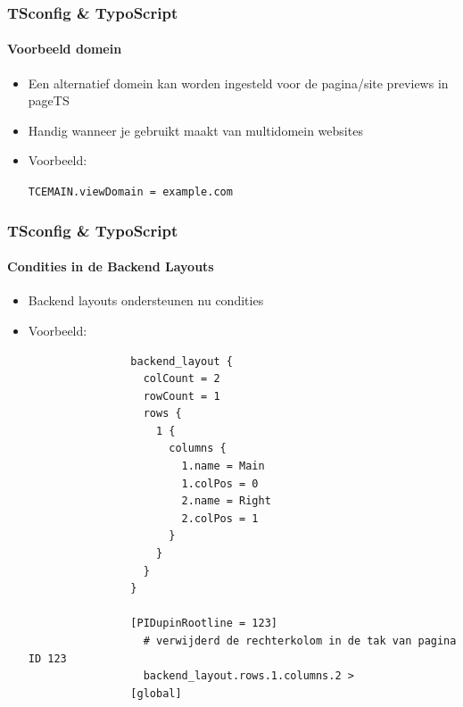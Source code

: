 
\begin{frame}[fragile]
	\frametitle{TSconfig \& TypoScript}
	\framesubtitle{Voorbeeld domein}

	\begin{itemize}

		\item Een alternatief domein kan worden ingesteld voor de pagina/site previews in pageTS
		\item Handig wanneer je gebruikt maakt van multidomein websites
		\item Voorbeeld:

			\lstinline!TCEMAIN.viewDomain = example.com!

	\end{itemize}

\end{frame}


\begin{frame}[fragile]
	\frametitle{TSconfig \& TypoScript}
	\framesubtitle{Condities in  de Backend Layouts}

	\begin{itemize}

		\item Backend layouts ondersteunen nu condities
		\item Voorbeeld:

			\lstset{
				basicstyle=\tiny\ttfamily
			}

			\begin{lstlisting}
				backend_layout {
				  colCount = 2
				  rowCount = 1
				  rows {
				    1 {
				      columns {
				        1.name = Main
				        1.colPos = 0
				        2.name = Right
				        2.colPos = 1
				      }
				    }
				  }
				}

				[PIDupinRootline = 123]
				  # verwijderd de rechterkolom in de tak van pagina ID 123
				  backend_layout.rows.1.columns.2 >
				[global]
			\end{lstlisting}

	\end{itemize}

\end{frame}


